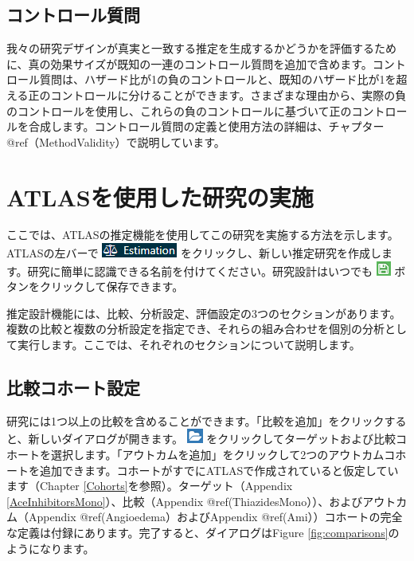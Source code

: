 \documentclass[
  11pt]{book}
\theoremstyle{definition}
\theoremstyle{definition}
\theoremstyle{definition}
\theoremstyle{definition}
\theoremstyle{remark}
\begin{document}
\subsection{コントロール質問}\label{ux30b3ux30f3ux30c8ux30edux30fcux30ebux8ceaux554f}

我々の研究デザインが真実と一致する推定を生成するかどうかを評価するために、真の効果サイズが既知の一連のコントロール質問を追加で含めます。コントロール質問は、ハザード比が1の負のコントロールと、既知のハザード比が1を超える正のコントロールに分けることができます。さまざまな理由から、実際の負のコントロールを使用し、これらの負のコントロールに基づいて正のコントロールを合成します。コントロール質問の定義と使用方法の詳細は、チャプター @ref（MethodValidity）で説明しています。

\section{ATLASを使用した研究の実施}\label{PleAtlas}

ここでは、ATLASの推定機能を使用してこの研究を実施する方法を示します。ATLASの左バーで \includegraphics{images/PopulationLevelEstimation/estimation.png} をクリックし、新しい推定研究を作成します。研究に簡単に認識できる名前を付けてください。研究設計はいつでも \includegraphics{images/PopulationLevelEstimation/save.png} ボタンをクリックして保存できます。

推定設計機能には、比較、分析設定、評価設定の3つのセクションがあります。複数の比較と複数の分析設定を指定でき、それらの組み合わせを個別の分析として実行します。ここでは、それぞれのセクションについて説明します。

\subsection{比較コホート設定}\label{ComparisonSettings}

研究には1つ以上の比較を含めることができます。「比較を追加」をクリックすると、新しいダイアログが開きます。 \includegraphics{images/PopulationLevelEstimation/open.png} をクリックしてターゲットおよび比較コホートを選択します。「アウトカムを追加」をクリックして2つのアウトカムコホートを追加できます。コホートがすでにATLASで作成されていると仮定しています（Chapter \ref{Cohorts}を参照）。ターゲット（Appendix \ref{AceInhibitorsMono}）、比較（Appendix @ref(ThiazidesMono））、およびアウトカム（Appendix @ref(Angioedema）およびAppendix @ref(Ami））コホートの完全な定義は付録にあります。完了すると、ダイアログはFigure \ref{fig:comparisons}のようになります。
\end{document}
